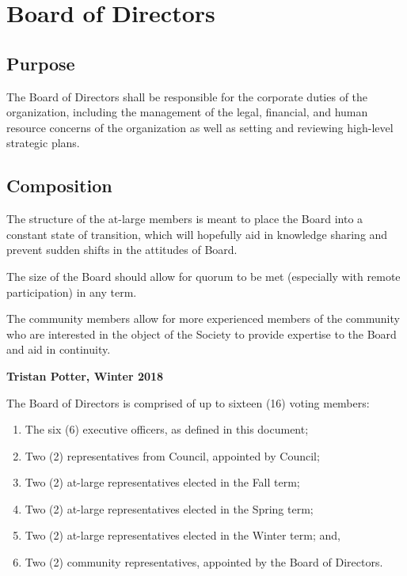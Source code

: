 \section{Board of Directors}
\subsection{Purpose}
The Board of Directors shall be responsible for the corporate duties of the
organization, including the management of the legal, financial, and human
resource concerns of the organization as well as setting and reviewing
high-level strategic plans.

\subsection{Composition}
\begin{annotation}
    The structure of the at-large members is meant to place the Board into
    a constant state of transition, which will hopefully aid in knowledge
    sharing and prevent sudden shifts in the attitudes of Board. 

    The size of the Board should allow for quorum to be met (especially with
    remote participation) in any term. 

    The community members allow for more experienced members of the community
    who are interested in the object of the Society to provide expertise to the
    Board and aid in continuity.

    \textbf{Tristan Potter, Winter 2018}
\end{annotation}

The Board of Directors is comprised of up to sixteen (16) voting members:
\begin{enumerate}
    \item The six (6) executive officers, as defined in this document; 
    \item Two (2) representatives from Council, appointed by Council; 
    \item Two (2) at-large representatives elected in the Fall term;
    \item Two (2) at-large representatives elected in the Spring term;
    \item Two (2) at-large representatives elected in the Winter term; and,
    \item Two (2) community representatives, appointed by the Board of Directors.
\end{enumerate}

